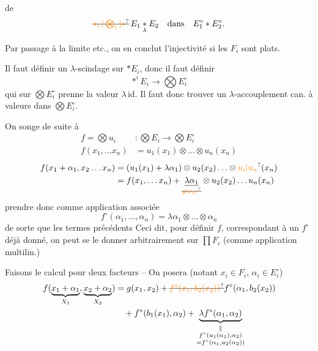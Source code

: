  de
\[
\deleted{\unsure{\mathop{*}_{i}|\bigotimes_i|*}}\, E_1\mathbin{\underset{\lambda}{*}}E_2\quad\text{dans}\quad E_1^\circ * E_2^\circ .
\]

Par passage à la limite etc., on en conclut l'injectivité si les $F_i$ sont plats.

Il faut définir un $\lambda$-scindage  sur $* E_i$, donc il faut définir
\[
\mathop{*}^{i}E_i \longrightarrow \bigotimes E_i^\circ
\]
qui sur $\bigotimes E_i^\circ$ prenne la valeur $\lambda\,\mathrm{id}$. Il faut donc trouver un $\lambda$-accouplement can. à valeurs dans $\bigotimes E_i^\circ$.

On songe  de suite à
\[
\begin{aligned}
f=\bigotimes u_i &: \bigotimes E_i\longrightarrow\bigotimes E_i^\circ\\
f(x_1,\ldots x_n)&=u_1(x_1)\otimes\ldots\otimes u_n(x_n)
\end{aligned}
\]
\[
\begin{aligned}
 f(x_1+\alpha_1,x_2\ldots x_n)&=(u_1(x_1)+\lambda\alpha_1)\otimes u_2(x_2)\ldots\otimes\unsure{u_i|u_n}(x_n)\\
 &=f(x_1,\ldots x_n)+\underset{\deleted{\unsure{g(x_2)}}}{\underline{\lambda\alpha_1}}\otimes u_2(x_2)\ldots u_n(x_n)
\end{aligned}
\]
prendre donc comme application associée
\[
 f^\circ(\alpha_1,\ldots,\alpha_n)=\lambda\alpha_1\otimes\ldots\otimes\alpha_n
\]
de sorte que les termes  précédents 
Ceci dit, pour définir  $f$,  correspondant à un $f^\circ$ déjà donné, on peut se le donner arbitrairement  sur $\prod F_i$ (comme application multilin.)


Faisons le calcul pour deux facteurs -- On posera (notant $x_i\in F_i$, $\alpha_i\in E_i^\circ$)
\[
\begin{aligned}
 f(\underbrace{x_1+\alpha_1}_{X_1},\underbrace{x_2+\alpha_2}_{X_2})
 &=g(x_1,x_2)+\deleted{\unsure{f^\circ(x_1,b_2(x_2))}}f^\circ(\alpha_1,b_2(x_2))\\
 &\quad+f^\circ(b_1(x_1),\alpha_2)+
 \underbrace{\lambda f^\circ(\alpha_1,\alpha_2)}_{\substack{\Vert\\f^\circ(u_1(\alpha_1),\alpha_2)\\=f^\circ(\alpha_1,u_2(\alpha_2))}}
\end{aligned}
\]

